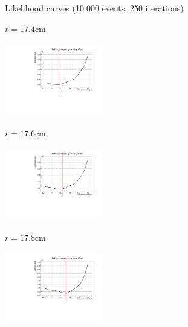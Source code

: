 \documentclass[handout,8 pt]{beamer}
\begin{document}
\begin{frame}{Likelihood curves (10.000 events, 250 iterations)}
\vspace{-5pt}
\begin{minipage}[c]{.32\textwidth}
\begin{exampleblock}{} \begin{center}$r = 17.4$cm\end{center} \end{exampleblock}
\includegraphics[width=4.2cm, height=3.2cm]{figs/likelihood250LowStat/likelihood17p4.pdf} 
\end{minipage}
\begin{minipage}[c]{.32\textwidth}
\begin{exampleblock}{} \begin{center}$r = 17.6$cm\end{center} \end{exampleblock}
\includegraphics[width=4.2cm, height=3.2cm]{figs/likelihood250LowStat/likelihood17p6.pdf} 
\end{minipage}
\begin{minipage}[c]{.32\textwidth}
\begin{exampleblock}{} \begin{center}$r = 17.8$cm\end{center} \end{exampleblock}
\includegraphics[width=4.2cm, height=3.2cm]{figs/likelihood250LowStat/likelihood17p8.pdf} 
\end{minipage}
\end{frame}
\end{document}
